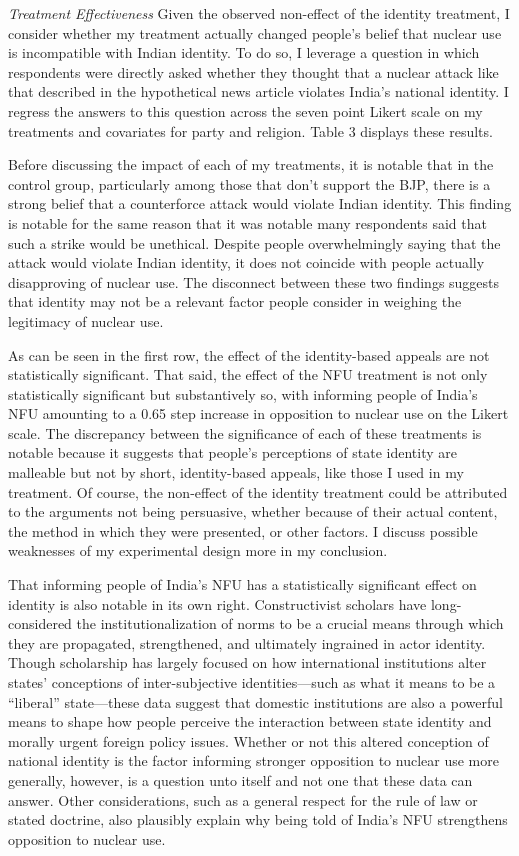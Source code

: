 \documentclass[12pt]{article}
\begin{document}
\textit{Treatment Effectiveness} Given the observed non-effect of the identity treatment, I consider whether my treatment actually changed people's belief that nuclear use is incompatible with Indian identity. To do so, I leverage a question in which respondents were directly asked whether they thought that a nuclear attack like that described in the hypothetical news article violates India's national identity. I regress the answers to this question across the seven point Likert scale on my treatments and covariates for party and religion. Table 3 displays these results.

Before discussing the impact of each of my treatments, it is notable that in the control group, particularly among those that don't support the BJP, there is a strong belief that a counterforce attack would violate Indian identity. This finding is notable for the same reason that it was notable many respondents said that such a strike would be unethical. Despite people overwhelmingly saying that the attack would violate Indian identity, it does not coincide with people actually disapproving of nuclear use. The disconnect between these two findings suggests that identity may not be a relevant factor people consider in weighing the legitimacy of nuclear use.

As can be seen in the first row, the effect of the identity-based appeals are not statistically significant. That said, the effect of the NFU treatment is not only statistically significant but substantively so, with informing people of India's NFU amounting to a 0.65 step increase in opposition to nuclear use on the Likert scale. The discrepancy between the significance of each of these treatments is notable because it suggests that people's perceptions of state identity are malleable but not by short, identity-based appeals, like those I used in my treatment. Of course, the non-effect of the identity treatment could be attributed to the arguments not being persuasive, whether because of their actual content, the method in which they were presented, or other factors. I discuss possible weaknesses of my experimental design more in my conclusion.

That informing people of India's NFU has a statistically significant effect on identity is also notable in its own right. Constructivist scholars have long-considered the institutionalization of norms to be a crucial means through which they are propagated, strengthened, and ultimately ingrained in actor identity. Though scholarship has largely focused on how international institutions alter states' conceptions of inter-subjective identities—such as what it means to be a “liberal” state—these data suggest that domestic institutions are also a powerful means to shape how people perceive the interaction between state identity and morally urgent foreign policy issues. Whether or not this altered conception of national identity is the factor informing stronger opposition to nuclear use more generally, however, is a question unto itself and not one that these data can answer. Other considerations, such as a general respect for the rule of law or stated doctrine, also plausibly explain why being told of India's NFU strengthens opposition to nuclear use.
\end{document}
